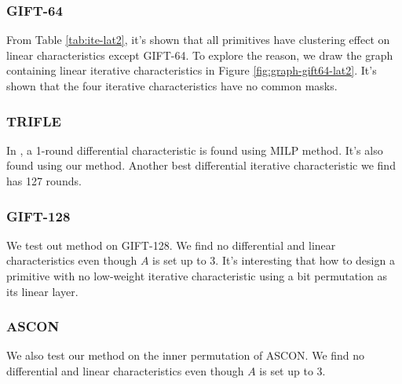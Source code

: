 \subsubsection{GIFT-64} From Table \ref{tab:ite-lat2}, it's shown that all primitives have clustering effect on linear characteristics except GIFT-64. To explore the reason, we draw the graph containing linear iterative characteristics in Figure \ref{fig:graph-gift64-lat2}. It's shown that the four iterative characteristics have no common masks. 



\subsubsection{TRIFLE} In \cite{liu2019iterative}, a 1-round differential characteristic is found using MILP method. It's also found using our method. Another best differential iterative characteristic we find has 127 rounds. 

\subsubsection{GIFT-128 \cite{banik2017gift}} We test out method on GIFT-128. We find no differential and linear characteristics even though $A$ is set up to 3. It's interesting that how to design a primitive with no low-weight iterative characteristic using a bit permutation as its linear layer. 

\subsubsection{ASCON \cite{dobraunig2016ascon}} We also test our method on the inner permutation of ASCON. We find no differential and linear characteristics even though $A$ is set up to 3. 

